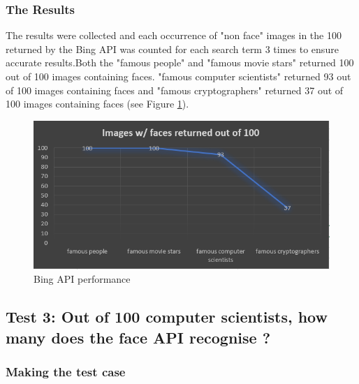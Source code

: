 \documentclass[12pt,a4paper]{article}
\begin{document}
\subsubsection{The Results} 

The results were collected and each occurrence of "non face"  images in the 100 returned by the Bing API was counted for each search term 3 times to ensure accurate results.Both the "famous people" and "famous movie stars" returned 100 out of 100 images containing faces. "famous computer scientists" returned 93 out of 100 images containing faces and "famous cryptographers" returned 37 out of 100 images containing faces (see Figure \ref{bingev}). 


\begin{figure}[!ht]
    \centering
    \includegraphics[width=1.0\textwidth]{Figs/bingev.PNG} 
    \caption{Bing API performance} 
    \label{bingev}
\end{figure}



\subsection{Test 3: Out of 100 computer scientists, how many does the face API recognise ?}  

\subsubsection{Making the test case}
\end{document}

